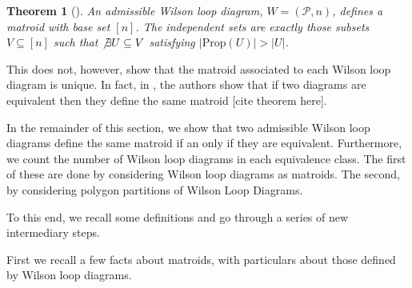 \documentclass[11pt]{article}
\newcommand{\cP}{\mathcal{P}}
\newcommand{\Prop}{\textrm{Prop}}
\newtheorem{thm}{Theorem}[section]
\theoremstyle{remark}
\theoremstyle{definition}
\begin{document}
\begin{thm}[\cite{wilsonloop}] An admissible Wilson loop diagram, $W =(\cP, n)$, defines a matroid with base set $[n]$. The independent sets are exactly those subsets $V \subseteq [n]$ such that $\not \exists U\subseteq V$ satisfying $|\Prop(U)|> |U|$. \label{thm:WLDmatroid}\end{thm}

This does not, however, show that the matroid associated to each Wilson loop diagram is unique. In fact, in \cite{wilsonloop}, the authors show that if two diagrams are equivalent then they define the same matroid [cite theorem here].

In the remainder of this section, we show that two admissible Wilson loop diagrams define the same matroid if an only if they are equivalent. Furthermore, we count the number of Wilson loop diagrams in each equivalence class. The first of these are done by considering Wilson loop diagrams as matroids. The second, by considering polygon partitions of Wilson Loop Diagrams.

To this end, we recall some definitions and go through a series of new intermediary steps.

First we recall a few facts about matroids, with particulars about those defined by Wilson loop diagrams.
\end{document}
